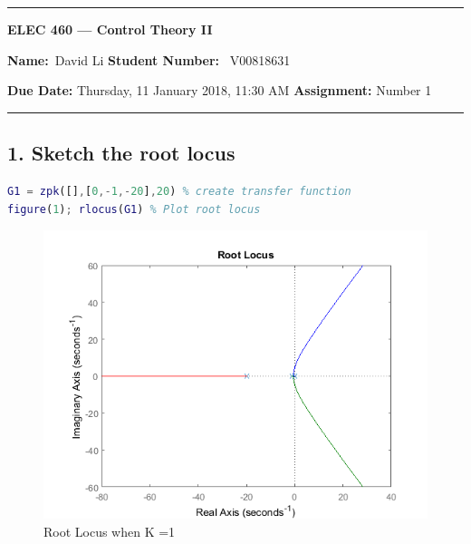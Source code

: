 \begin{center}
	\hrule
	\vspace{.4cm}
	{\textbf { \large ELEC 460 --- Control Theory II}}
\end{center}
{\textbf{Name:}\ David Li \hspace{\fill} \textbf{Student Number:}} \ V00818631  \\
{\textbf{Due Date:} Thursday, 11 January 2018, 11:30 AM \hspace{\fill} \textbf{Assignment:} Number 1 \\
	\hrule

    
    


%
%


\subsection*{1. Sketch the root locus}


\begin{lstlisting}[language = Matlab,frame=single,caption={}]
G1 = zpk([],[0,-1,-20],20) % create transfer function
figure(1); rlocus(G1) % Plot root locus
\end{lstlisting}

         
% 
% 
%
    
\begin{figure}[h]
	\centering
	\includegraphics [width=0.7\linewidth]{ELEC460A1_01.png}
	\caption{Root Locus when K =1}
\end{figure}


}
